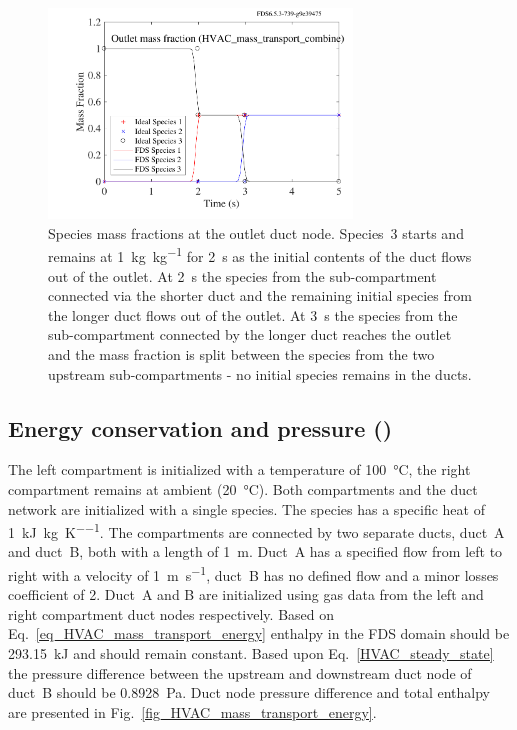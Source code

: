 \documentclass[11pt]{book}
\begin{document}
\begin{figure}[ht]
\centering
\includegraphics[height=2.2in]{SCRIPT_FIGURES/HVAC_mass_transport_combine}
\caption[ test case]{Species mass fractions at the outlet duct node. Species~3 starts and remains at \SI[per-mode=symbol]{1}{\kilogram\per\kilogram} for \SI{2}{\second} as the initial contents of the duct flows out of the outlet. At \SI{2}{\second} the species from the sub-compartment connected via the shorter duct and the remaining initial species from the longer duct flows out of the outlet. At \SI{3}{\second} the species from the sub-compartment connected by the longer duct reaches the outlet and the mass fraction is split between the species from the two upstream sub-compartments - no initial species remains in the ducts.}
\label{fig_HVAC_mass_transport_combine}
\end{figure}

\subsection{Energy conservation and pressure (\texorpdfstring{}{HVAC\_mass\_transport\_energy})}
\label{HVAC_mass_transport_energy}
The left compartment is initialized with a temperature of \SI{100}{\degreeCelsius}, the right compartment remains at ambient (\SI{20}{\degreeCelsius}). Both compartments and the duct network are initialized with a single species. The species has a specific heat of \SI[per-mode=symbol]{1}{\kilo\joule\per\kilogram\per\kelvin}. The compartments are connected by two separate ducts, duct~A and duct~B, both with a length of \SI{1}{\meter}. Duct~A has a specified flow from left to right with a velocity of \SI[per-mode=symbol]{1}{\meter\per\second}, duct~B has no defined flow and a minor losses coefficient of \num{2}. Duct~A and B are initialized using gas data from the left and right compartment duct nodes respectively. Based on Eq.~\ref{eq_HVAC_mass_transport_energy} enthalpy in the FDS domain should be \SI{293.15}{\kilo\joule} and should remain constant. Based upon Eq.~\ref{HVAC_steady_state} the pressure difference between the upstream and downstream duct node of duct~B should be \SI{0.8928}{\pascal}. Duct node pressure difference and total enthalpy are presented in Fig.~\ref{fig_HVAC_mass_transport_energy}.
\end{document}
